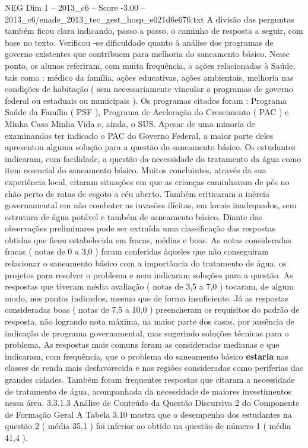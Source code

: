 \begin{textsample}{NEG Dim 1 – 2013\_c6 – Score -3.00 – 2013\_c6/enade\_2013\_tec\_gest\_hosp\_e021d6e676.txt}
A divisão das perguntas também ficou clara indicando, passo a passo, o caminho de resposta a seguir, com base no texto.
Verificou -se dificuldade quanto à análise dos programas de governo existentes que contribuem para melhoria do saneamento básico.
Nesse ponto, os alunos referiram, com muita frequência, a ações relacionadas à Saúde, tais como : médico da família, ações educativas, ações ambientais, melhoria nas condições de habitação ( sem necessariamente vincular a programas de governo federal ou estaduais ou municipais ).
Os programas citados foram : Programa Saúde da Família ( PSF ), Programa de Aceleração do Crescimento ( PAC ) e Minha Casa Minha Vida e, ainda, o SUS.
Apesar de uma minoria de examinandos ter indicado o PAC do Governo Federal, a maior parte deles apresentou alguma solução para a questão do saneamento básico.
Os estudantes indicaram, com facilidade, a questão da necessidade do tratamento da água como item essencial do saneamento básico.
Muitos concluintes, através da sua experiência local, citaram situações em que as crianças caminhavam de pés no chão perto de rotas de esgoto a céu aberto.
Também criticaram a inércia governamental em não combater as invasões ilícitas, em locais inadequados, sem estrutura de água potável e também de saneamento básico.
Diante das observações preliminares pode ser extraída uma classificação das respostas obtidas que ficou estabelecida em fracas, médias e boas.
As notas consideradas fracas ( notas de 0 a 3,0 ) foram conferidas àqueles que não conseguiram relacionar o saneamento básico com a importância do tratamento de água, os projetos para resolver o problema e nem indicaram soluções para a questão.
As respostas que tiveram média avaliação ( notas de 3,5 a 7,0 ) tocaram, de algum modo, nos pontos indicados, mesmo que de forma insuficiente.
Já as respostas consideradas boas ( notas de 7,5 a 10,0 ) preencheram os requisitos do padrão de resposta, não logrando nota máxima, na maior parte dos casos, por ausência de indicação de programa governamental, mas sugerindo soluções técnicas para o problema.
As respostas mais comuns foram as consideradas medianas e que indicaram, com frequência, que o problema do saneamento básico \textbf{estaria} nas classes de renda mais desfavorecida e nas regiões consideradas como periferias das grandes cidades.
Também foram frequentes respostas que citaram a necessidade de tratamento de água, acompanhada da necessidade de maiores investimentos nessa área. 3.3.1.3 Análise de Conteúdo da Questão Discursiva 2 do Componente de Formação Geral A Tabela 3.10 mostra que o desempenho dos estudantes na questão 2 ( média 35,1 ) foi inferior ao obtido na questão de número 1 ( média 41,4 ).

\end{textsample}
